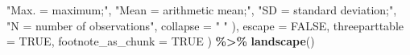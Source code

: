 \documentclass[
]{article}
\newenvironment{Shaded}{\begin{snugshade}}{\end{snugshade}}
\newcommand{\AttributeTok}[1]{\textcolor[rgb]{0.13,0.29,0.53}{#1}}
\newcommand{\ConstantTok}[1]{\textcolor[rgb]{0.56,0.35,0.01}{#1}}
\newcommand{\FunctionTok}[1]{\textcolor[rgb]{0.13,0.29,0.53}{\textbf{#1}}}
\newcommand{\NormalTok}[1]{#1}
\newcommand{\SpecialCharTok}[1]{\textcolor[rgb]{0.81,0.36,0.00}{\textbf{#1}}}
\newcommand{\StringTok}[1]{\textcolor[rgb]{0.31,0.60,0.02}{#1}}
\begin{document}
\begin{Shaded}
\begin{Highlighting}[]
            \StringTok{"\textasciigrave{}Max.\textquotesingle{} = maximum;"}\NormalTok{, }\StringTok{"\textasciigrave{}Mean\textquotesingle{} = arithmetic mean;"}\NormalTok{,}
            \StringTok{"\textasciigrave{}SD\textquotesingle{} = standard deviation;"}\NormalTok{,}
            \StringTok{"\textasciigrave{}N\textquotesingle{} = number of observations"}\NormalTok{,}
            \AttributeTok{collapse =} \StringTok{" "}
\NormalTok{        ),}
        \AttributeTok{escape =} \ConstantTok{FALSE}\NormalTok{, }\AttributeTok{threeparttable =} \ConstantTok{TRUE}\NormalTok{,}
        \AttributeTok{footnote\_as\_chunk =} \ConstantTok{TRUE}
\NormalTok{    ) }\SpecialCharTok{\%\textgreater{}\%}
    \FunctionTok{landscape}\NormalTok{()}
\end{Highlighting}
\end{Shaded}
\end{document}
